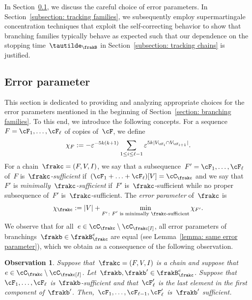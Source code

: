 \documentclass[11pt]{amsart}
\newcommand{\eps}{\varepsilon}
\DeclarePairedDelimiter{\abs}{\lvert}{\rvert}
\newtheorem{observation}[algocf]{Observation}
\theoremstyle{definition}
\numberwithin{equation}{section}
\begin{document}
	In Section~\ref{subsection: error parameter}, we discuss the careful choice of error parameters.
	In Section~\ref{subsection: tracking families}, we subsequently employ supermartingale concentration techniques that exploit the self-correcting behavior to show that branching families typically behave as expected such that our dependence on the stopping time~$\tautilde_\frakB$ in Section~\ref{subsection: tracking chains} is justified. 
	
	\subsection{Error parameter}\label{subsection: error parameter}
	This section is dedicated to providing and analyzing appropriate choices for the error parameters mentioned in the beginning of Section~\ref{section: branching families}.
	To this end, we introduce the following concepts.
	For a sequence~$F=\cF_1,\ldots,\cF_\ell$ of copies of~$\cF$, we define
	\begin{equation*}
		\chi_F:=-\eps^{-5k(k+1)}\sum_{1\leq i\leq \ell-1} \eps^{5k\abs{V_{\cF_{i}}\cap V_{\cF_{i+1}}}}.
	\end{equation*}
	For a chain~$\frakc=(F,V,I)$, we say that a subsequence~$F'=\cF_1,\ldots,\cF_\ell$ of~$F$ is~\emph{$\frakc$-sufficient} if~$(\cF_1+\ldots+\cF_\ell)[V]=\cC_\frakc$ and we say that~$F'$ is \emph{minimally~$\frakc$-sufficient} if~$F'$ is~$\frakc$-sufficient while no proper subsequence of~$F'$ is~$\frakc$-sufficient.
	The \emph{error parameter} of~$\frakc$ is
	\begin{equation*}
		\chi_\frakc:=\abs{V}+\min_{ F'\colon \text{$F'$ is minimally~$\frakc$-sufficient}  } \chi_{F'}.
	\end{equation*}
	We observe that for all~$e\in\cC_\frakc\setminus\cC_\frakc[I]$, all error parameters of branchings~$\frakb\in\frakB_\frakc^e$ are equal (see Lemma~\ref{lemma: same error parameter}), which we obtain as a consequence of the following observation.
	
	\begin{observation}\label{observation: sufficient for other branching}
		Suppose that~$\frakc=(F,V,I)$ is a chain and suppose that~$e\in\cC_\frakc\setminus\cC_\frakc[I]$.
		Let~$\frakb,\frakb'\in\frakB_\frakc^e$.
		Suppose that~$\cF_1,\ldots,\cF_\ell$ is~$\frakb$-sufficient and that~$\cF_\ell'$ is the last element in the first component of~$\frakb'$.
		Then,~$\cF_1,\ldots,\cF_{\ell-1},\cF_\ell'$ is~$\frakb'$ sufficient.
	\end{observation}
	
\end{document}
